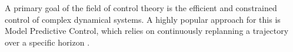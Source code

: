 \documentclass[11pt, titlepage]{article}
\begin{document}
A primary goal of the field of control theory is the efficient and constrained control of complex dynamical systems. A highly popular approach for this is Model Predictive Control, which relies on continuously replanning a trajectory over a specific horizon \cite{mpc_industry}.


    





\end{document}
